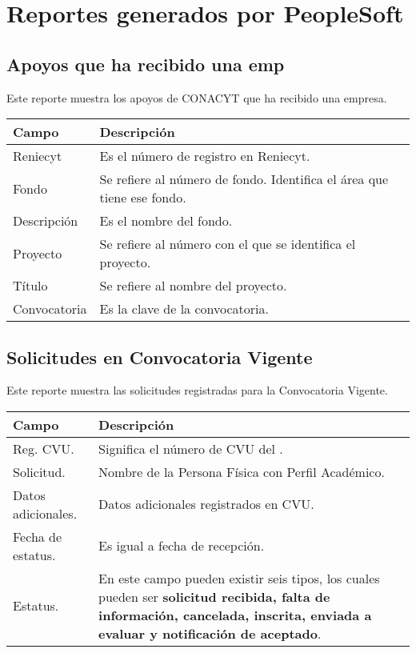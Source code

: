 \section{Reportes generados por PeopleSoft}
\label{appendix:Reportes:PeopleSoft}
\subsection{Apoyos que ha recibido una emp}
\label{appendix:Reportes:PeopleSoft:ApoyosRecibidosEmpresa}

Este reporte muestra los apoyos de CONACYT que ha recibido una empresa.\\

\begin{tabular}{ m{} m{}  }%
	\rowcolor{gray1} {\bf Campo} &  {\bf Descripción} \\ \hline \hline

	Reniecyt & Es el número de registro en Reniecyt.\\
	\rowcolor{gray1}Fondo & Se refiere al número de fondo. Identifica el área que tiene ese fondo.\\
	Descripción & Es el nombre del fondo.\\
	\rowcolor{gray1}Proyecto & Se refiere al número con el que se identifica el proyecto.\\
	Título & Se refiere al nombre del proyecto.\\
	\rowcolor{gray1}Convocatoria & Es la clave de la convocatoria.\\
\end{tabular}

\newpage
\subsection{Solicitudes en Convocatoria Vigente}
\label{appendix:Reportes:PeopleSoft:ConvocatoriaVigente}

Este reporte muestra las solicitudes registradas para la Convocatoria Vigente.\\

\begin{tabular}{ m{} m{}  }%
	\rowcolor{gray1} {\bf Campo} &  {\bf Descripción} \\ \hline \hline

	Reg. CVU.  & Significa el número de CVU del {Usuario}.\\
	\rowcolor{gray1}Solicitud. & Nombre de la Persona Física con Perfil Académico.\\
	Datos adicionales.  & Datos adicionales registrados en CVU.\\
	\rowcolor{gray1}Fecha de estatus.& Es igual a fecha de recepción.\\
	 Estatus.& En este campo pueden existir seis tipos, los cuales pueden ser {\bf solicitud recibida, falta de información,  cancelada, inscrita, enviada a evaluar y notificación de aceptado}.\\
	
\end{tabular}

